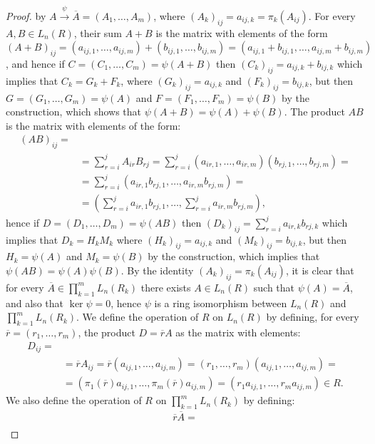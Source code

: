 \documentclass{article}
\begin{document}
\begin{proof}
by $A\overset{\psi}{\longrightarrow}\overline{A}=\left(A_1,\dots,A_m\right)$,
where $(A_k)_{ij}=a_{ij,k}=\pi_k(A_{ij})$.
For every $A,B\in{L}_n(R)$, their sum $A+B$ is the matrix with elements of the form $(A+B)_{ij}=\left(a_{ij,1},\dots,a_{ij,m}\right)+\left(b_{ij,1},\dots,b_{ij,m}\right)=\left(a_{ij,1}+b_{ij,1},\dots,a_{ij,m}+b_{ij,m}\right)$, and hence if $C=(C_1,\dots,C_m)=\psi(A+B)$ then $(C_k)_{ij}=a_{ij,k}+b_{ij,k}$
which implies that $C_k=G_k+F_k$, where $(G_k)_{ij}=a_{ij,k}$ and $(F_k)_{ij}=b_{ij,k}$, but then $G=\left(G_1,\dots,G_m\right)=\psi(A)$ and $F=\left(F_1,\dots,F
_m\right)=\psi(B)$ by the construction, which shows that $\psi(A+B)=\psi(A)+\psi(B)$.
The product $AB$ is the matrix with elements of the form:
\begin{align*}
(AB)_{ij}=\\
&=\sum_{r=i}^jA_{ir}B_{rj}=\sum_{r=i}^j\left(a_{ir,1},\dots,a_{ir,m}\right)\left(b_{rj,1},\dots,b_{rj,m}\right)=\\
&=\sum_{r=i}^j\left(a_{ir,1}b_{rj,1},\dots,a_{ir,m}b_{rj,m}\right)=\\
&=\left(\sum_{r=i}^ja_{ir,1}b_{rj,1},\dots,\sum_{r=i}^ja_{ir,m}b_{rj,m}\right),
\end{align*}
hence if $D=\left(D_1,\dots,D_m\right)=\psi(AB)$ then $(D_k)_{ij}=\sum_{r=i}^ja_{ir,k}b_{rj,k}$ which implies that $D_k=H_kM_k$ where $(H_k)_{ij}=a_{ij,k}$ and $(M_k)_{ij}=b_{ij,k}$, but then $H_k=\psi(A)$ and $M_k=\psi(B)$ by the construction, which implies that $\psi(AB)=\psi(A)\psi(B)$.
By the identity $(A_k)_{ij}=\pi_k(A_{ij})$, it is clear that for every $\overline{A}\in\prod_{k=1}^mL_n(R_k)$ there exists $A\in{L}_n(R)$ such that $\psi(A)=\overline{A}$, and also that $\ker\psi=0$, hence $\psi$ is a ring isomorphism between $L_n(R)$ and $\prod_{k=1}^mL_n(R_k)$.
We define the operation of $R$ on $L_n(R)$ by defining, for every $\overline{r}=\left(r_1,\dots,r_m\right)$, the product $D=\overline{r}A$ as the matrix with elements: 
\begin{align*}
D_{ij}=\\
&=\overline{r}A_{ij}=\overline{r}\left(a_{ij,1},\dots,a_{ij,m}\right)=\left(r_1,\dots,r_m\right)\left(a_{ij,1},\dots,a_{ij,m}\right)=\\
&=\left(\pi_1(\overline{r})a_{ij,1},\dots,\pi_m(\overline{r})a_{ij,m}\right)=\left(r_1a_{ij,1},\dots,r_ma_{ij,m}\right)\in{R}.
\end{align*}
We also define the operation of $R$ on $\prod_{k=1}^mL_n(R_k)$ by defining:
\begin{align*}
\overline{r}\overline{A}=\\

\end{align*}
\end{proof}
\end{document}
